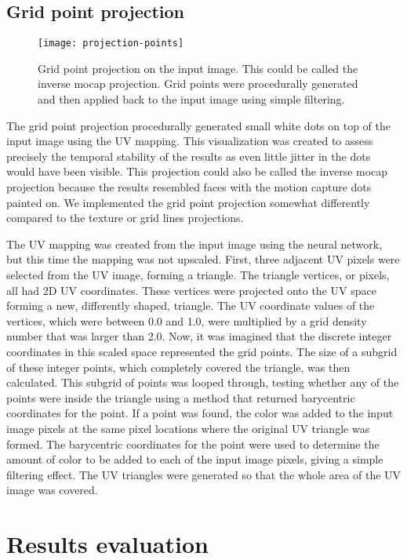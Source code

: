 \subsection{Grid point projection}

\begin{figure}
    \texttt{[image: projection-points]}
    \caption[Grid point projection]{Grid point projection on the input image. This could be called the inverse mocap projection. Grid points were procedurally generated and then applied back to the input image using simple filtering.}
    \label{fig:projection_points_1}
\end{figure}

The grid point projection procedurally generated small white dots on top of the input image using the UV mapping. This visualization was created to assess precisely the temporal stability of the results as even little jitter in the dots would have been visible. This projection could also be called the inverse mocap projection because the results resembled faces with the motion capture dots painted on. We implemented the grid point projection somewhat differently compared to the texture or grid lines projections.

The UV mapping was created from the input image using the neural network, but this time the mapping was not upscaled. First, three adjacent UV pixels were selected from the UV image, forming a triangle. The triangle vertices, or pixels, all had 2D UV coordinates. These vertices were projected onto the UV space forming a new, differently shaped, triangle. The UV coordinate values of the vertices, which were between 0.0 and 1.0, were multiplied by a grid density number that was larger than 2.0. Now, it was imagined that the discrete integer coordinates in this scaled space represented the grid points. The size of a subgrid of these integer points, which completely covered the triangle, was then calculated. This subgrid of points was looped through, testing whether any of the points were inside the triangle using a method that returned barycentric coordinates for the point. If a point was found, the color was added to the input image pixels at the same pixel locations where the original UV triangle was formed. The barycentric coordinates for the point were used to determine the amount of color to be added to each of the input image pixels, giving a simple filtering effect. The UV triangles were generated so that the whole area of the UV image was covered.

\section{Results evaluation}
\label{sec:results_eval}

